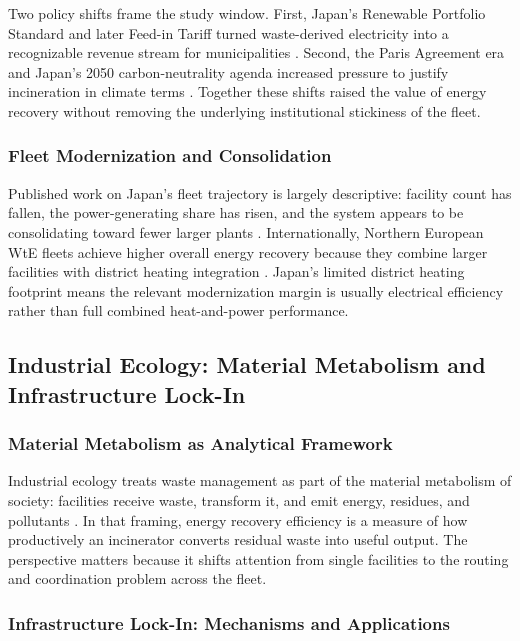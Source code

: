 \documentclass[12pt,a4paper]{article}
\begin{document}
Two policy shifts frame the study window. First, Japan's Renewable Portfolio Standard and later Feed-in Tariff turned waste-derived electricity into a recognizable revenue stream for municipalities \citep{MOEJ2022}. Second, the Paris Agreement era and Japan's 2050 carbon-neutrality agenda increased pressure to justify incineration in climate terms \citep{MOEJ2024}. Together these shifts raised the value of energy recovery without removing the underlying institutional stickiness of the fleet.

\subsubsection{Fleet Modernization and Consolidation}

Published work on Japan's fleet trajectory is largely descriptive: facility count has fallen, the power-generating share has risen, and the system appears to be consolidating toward fewer larger plants \citep{MOEJ2022}. Internationally, Northern European WtE fleets achieve higher overall energy recovery because they combine larger facilities with district heating integration \citep{Munster2010}. Japan's limited district heating footprint means the relevant modernization margin is usually electrical efficiency rather than full combined heat-and-power performance.

\subsection{Industrial Ecology: Material Metabolism and Infrastructure Lock-In}

\subsubsection{Material Metabolism as Analytical Framework}

Industrial ecology treats waste management as part of the material metabolism of society: facilities receive waste, transform it, and emit energy, residues, and pollutants \citep{Ayres1994}. In that framing, energy recovery efficiency is a measure of how productively an incinerator converts residual waste into useful output. The perspective matters because it shifts attention from single facilities to the routing and coordination problem across the fleet.

\subsubsection{Infrastructure Lock-In: Mechanisms and Applications}
\end{document}
